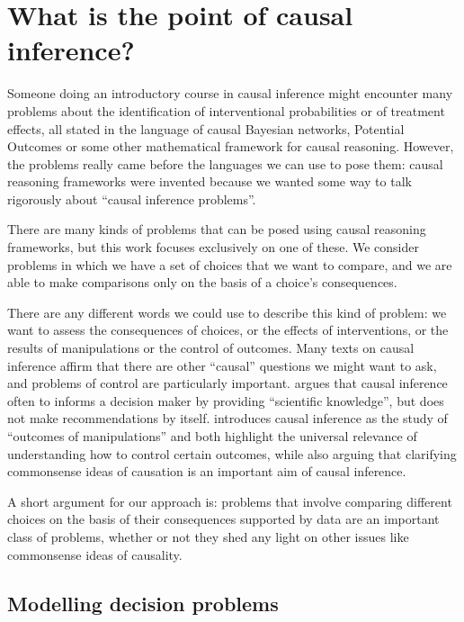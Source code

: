\section{What is the point of causal inference?}\label{sec:whats_the_point}

Someone doing an introductory course in causal inference might encounter many problems about the identification of interventional probabilities or of treatment effects, all stated in the language of causal Bayesian networks, Potential Outcomes or some other mathematical framework for causal reasoning. However, the problems really came before the languages we can use to pose them: causal reasoning frameworks were invented because we wanted some way to talk rigorously about ``causal inference problems''.

There are many kinds of problems that can be posed using causal reasoning frameworks, but this work focuses exclusively on one of these. We consider problems in which we have a set of choices that we want to compare, and we are able to make comparisons only on the basis of a choice's consequences.

There are any different words we could use to describe this kind of problem: we want to assess the consequences of choices, or the effects of interventions, or the results of manipulations or the control of outcomes. Many texts on causal inference affirm that there are other ``causal'' questions we might want to ask, and problems of control are particularly important. \citet{rubin_causal_2005} argues that causal inference often to informs a decision maker by providing ``scientific knowledge'', but does not make recommendations by itself. \citep{imbens_causal_2015} introduces causal inference as the study of ``outcomes of manipulations'' and both \citep{spirtes_causation_1993,pearl_causality:_2009} highlight the universal relevance of understanding how to control certain outcomes, while also arguing that clarifying commonsense ideas of causation is an important aim of causal inference.

A short argument for our approach is: problems that involve comparing different choices on the basis of their consequences supported by data are an important class of problems, whether or not they shed any light on other issues like commonsense ideas of causality.

\subsection{Modelling decision problems}

